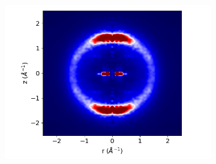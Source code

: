 \documentclass{article}
\begin{document}
\begin{figure}
\begin{subfigure}{0.3\linewidth}
        \includegraphics[width=\linewidth]{offset_rzplot.png}
        \caption{}~\label{fig:rz_offset}
  \end{subfigure}
  \begin{subfigure}{0.0544\linewidth}
        \centering
	\vspace{-3.30em}

\end{subfigure}
\end{figure}
\end{document}
